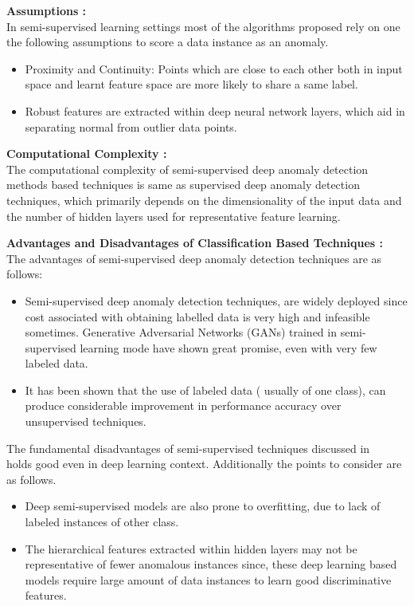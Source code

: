 \textbf{Assumptions : } \\
In semi-supervised learning settings most of the algorithms proposed rely on one the following assumptions to score a data instance as an anomaly.
\begin{itemize}
 \item  Proximity and Continuity: Points which are close to each other both in input space  and learnt feature space are more likely to share a same label.
  \item Robust features are extracted within deep neural network layers, which aid in separating normal from outlier data points.
\end{itemize}

\textbf{Computational Complexity :} \\
The computational complexity of semi-supervised deep anomaly detection methods based techniques is same as supervised deep anomaly detection techniques, which primarily depends on the dimensionality of the input data and the number of hidden layers used for representative feature learning.

\textbf{Advantages and Disadvantages of Classification Based Techniques :}\\
The advantages of semi-supervised deep anomaly detection techniques are as follows:
\begin{itemize}
\item Semi-supervised deep anomaly detection techniques, are widely deployed since cost associated with obtaining labelled data is very high and infeasible sometimes. Generative Adversarial Networks (GANs) trained in semi-supervised learning mode have shown great promise, even with very few labeled data.
\item  It has been shown that the use of labeled data ( usually of one class), can produce considerable improvement in performance  accuracy over unsupervised techniques.
\end{itemize}
The fundamental disadvantages of semi-supervised techniques discussed in ~\cite{lu2009fundamental} holds good even in deep learning context. Additionally the points to consider are as follows.
\begin{itemize}
\item  Deep semi-supervised models are also prone to overfitting, due to lack of labeled instances of other class.
\item The hierarchical features extracted within hidden layers may not be representative of fewer anomalous instances since, these deep learning based models require large amount of data instances  to learn good discriminative features.
\end{itemize}










